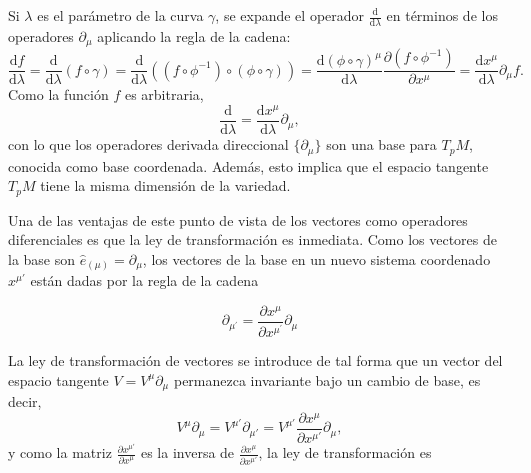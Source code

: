 \begin{center}
\end{center}
Si $\lambda$ es el parámetro de la curva $\gamma$, se expande el operador $\frac{\mathrm{d}}{\mathrm{d}\lambda}$ en términos de los operadores $\partial_\mu$ aplicando la regla de la cadena:
$$\frac{\mathrm{d}f}{\mathrm{d}\lambda}=\frac{\mathrm{d}}{\mathrm{d}\lambda}(f\circ\gamma)=\frac{\mathrm{d}}{\mathrm{d}\lambda}((f\circ\phi^{-1})\circ(\phi\circ\gamma))=\frac{\mathrm{d}(\phi\circ\gamma)^\mu}{\mathrm{d}\lambda}\frac{\partial(f\circ\phi^{-1})}{\partial x^\mu}=\frac{\mathrm{d}x^\mu}{\mathrm{d}\lambda}\partial_\mu f.$$
Como la función $f$ es arbitraria,
$$\frac{\mathrm{d}}{\mathrm{d}\lambda}=\frac{\mathrm{d}x^\mu}{\mathrm{d}\lambda}\partial_\mu,$$
con lo que los operadores derivada direccional $\{\partial_\mu\}$ son una base para $T_pM$, conocida como base coordenada. Además, esto implica que el espacio tangente $T_pM$ tiene la misma dimensión de la variedad.

Una de las ventajas de este punto de vista de los vectores como operadores diferenciales es que la ley de transformación es inmediata. Como los vectores de la base son $\hat{e}_{(\mu)}=\partial_{\mu}$, los vectores de la base en un nuevo sistema coordenado $x^{\mu'}$ están dadas por la regla de la cadena \cite{Carroll}

$$\partial_{\mu^{\prime}}=\frac{\partial x^{\mu}}{\partial x^{\mu^{\prime}}} \partial_{\mu}$$

La ley de transformación de vectores se introduce de tal forma que un vector del espacio tangente $V=V^\mu \partial_\mu$ permanezca invariante bajo un cambio de base, es decir,
$$V^\mu\partial_\mu=V^{\mu'}\partial_{\mu'}=V^{\mu'}\frac{\partial x^\mu}{\partial x^{\mu'}}\partial_\mu,$$
y como la matriz $\frac{\partial x^{\mu'}}{\partial x^{\mu}}$ es la inversa de $\frac{\partial x^\mu}{\partial x^{\mu'}}$, la ley de transformación es

